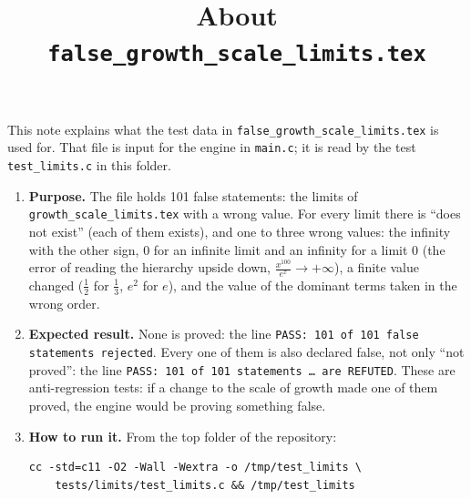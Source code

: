\documentclass[11pt,a4paper]{article}
\title{About \texttt{false\_growth\_scale\_limits.tex}}
\author{}
\date{}
\begin{document}
\maketitle
This note explains what the test data in \texttt{false\_growth\_scale\_limits.tex} is used for. That file is input for the engine in \texttt{main.c}; it is read by the test \texttt{test\_limits.c} in this folder.

\begin{enumerate}
\item \textbf{Purpose.} The file holds 101 false statements: the limits of \texttt{growth\_scale\_limits.tex} with a wrong value. For every limit there is ``does not exist'' (each of them exists), and one to three wrong values: the infinity with the other sign, $0$ for an infinite limit and an infinity for a limit $0$ (the error of reading the hierarchy upside down, $\frac{x^{100}}{e^{x}} \to +\infty$), a finite value changed ($\frac{1}{2}$ for $\frac{1}{3}$, $e^{2}$ for $e$), and the value of the dominant terms taken in the wrong order.

\item \textbf{Expected result.} None is proved: the line \texttt{PASS: 101 of 101 false statements rejected}. Every one of them is also declared false, not only ``not proved'': the line \texttt{PASS: 101 of 101 statements \dots{} are REFUTED}. These are anti-regression tests: if a change to the scale of growth made one of them proved, the engine would be proving something false.

\item \textbf{How to run it.} From the top folder of the repository:
\begin{verbatim}
cc -std=c11 -O2 -Wall -Wextra -o /tmp/test_limits \
    tests/limits/test_limits.c && /tmp/test_limits
\end{verbatim}
\end{enumerate}
\end{document}
